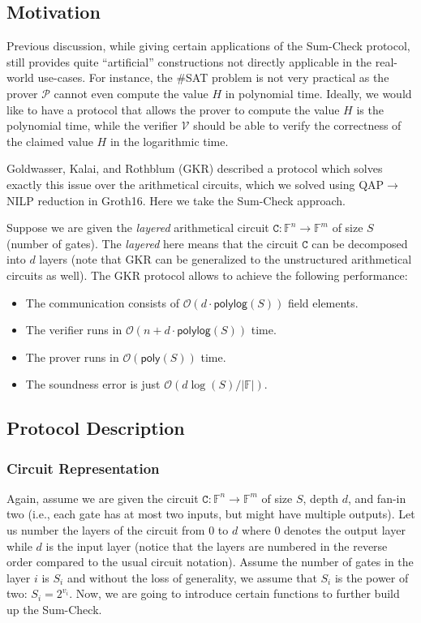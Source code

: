 
\subsection{Motivation}
Previous discussion, while giving certain applications of the Sum-Check
protocol, still provides quite ``artificial'' constructions not 
directly applicable in the real-world use-cases. For instance, 
the \#SAT problem is not very practical as the prover $\mathcal{P}$
cannot even compute the value $H$ in polynomial time. Ideally,
we would like to have a protocol that allows the prover to compute
the value $H$ is the polynomial time, while the verifier $\mathcal{V}$
should be able to verify the correctness of the claimed value
$H$ in the logarithmic time. 

Goldwasser, Kalai, and Rothblum (GKR) \cite{gkr} described a protocol which
solves exactly this issue over the arithmetical circuits, which
we solved using QAP$\to$NILP reduction in Groth16. Here we take
the Sum-Check approach.

Suppose we are given the \textit{layered} arithmetical
circuit $\mathtt{C}: \mathbb{F}^n \to \mathbb{F}^m$ of size 
$S$ (number of gates). The \textit{layered} here means 
that the circuit $\mathtt{C}$ can be decomposed into $d$ 
layers (note that GKR can be generalized to the unstructured 
arithmetical circuits as well). The GKR protocol allows 
to achieve the following performance:
\begin{itemize}
    \item The communication consists of $\mathcal{O}(d \cdot \mathsf{polylog}(S))$ field elements.
    \item The verifier runs in $\mathcal{O}(n + d \cdot \mathsf{polylog}(S))$ time.
    \item The prover runs in $\mathcal{O}(\mathsf{poly}(S))$ time.
    \item The soundness error is just $\mathcal{O}(d \log(S) / |\mathbb{F}|)$.
\end{itemize}

\subsection{Protocol Description}

\subsubsection{Circuit Representation}

Again, assume we are given the circuit $\mathtt{C}: \mathbb{F}^n \to
\mathbb{F}^m$ of size $S$, depth $d$, and fan-in two (i.e., each gate has at
most two inputs, but might have multiple outputs). Let us number the layers of
the circuit from $0$ to $d$ where $0$ denotes the output layer while $d$ is the
input layer (notice that the layers are numbered in the reverse order compared
to the usual circuit notation). Assume the number of gates in the layer $i$ is
$S_i$ and without the loss of generality, we assume that $S_i$ is the power of
two: $S_i = 2^{v_i}$. Now, we are going to introduce certain functions 
to further build up the Sum-Check.

